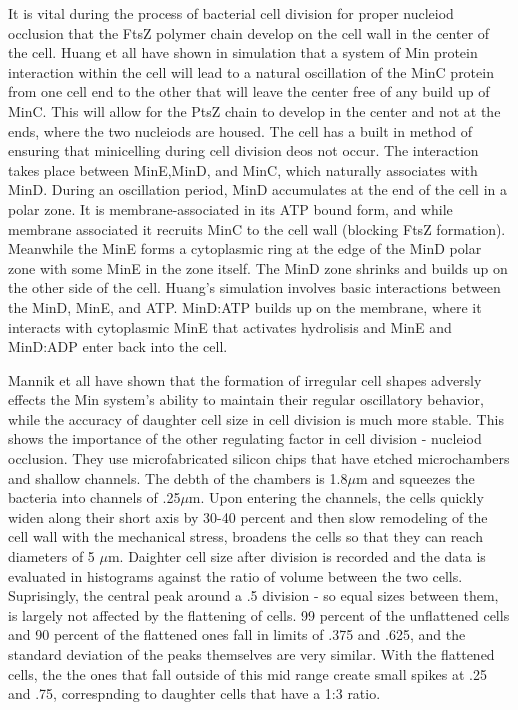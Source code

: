 \documentclass[pdftex,10pt,a4paper]{article}
\begin{document}



It is vital during the process of bacterial cell division for proper nucleiod occlusion that the FtsZ polymer chain develop on the cell wall in the center of the cell.  Huang et all have shown in simulation that a system of Min protein interaction within the cell will lead to a natural oscillation of the MinC protein from one cell end to the other that will leave the center free of any build up of MinC.  This will allow for the PtsZ chain to develop in the center and not at the ends, where the two nucleiods are housed.  The cell has a built in method of ensuring that minicelling during cell division deos not occur.  The interaction takes place between MinE,MinD, and MinC, which naturally associates with MinD.  During an oscillation period, MinD accumulates at the end of the cell in a polar zone.  It is membrane-associated in its ATP bound form, and while membrane associated it recruits MinC to the cell wall (blocking FtsZ formation).  Meanwhile the MinE forms a cytoplasmic ring at the edge of the MinD polar zone with some MinE in the zone itself.  The MinD zone shrinks and builds up on the other side of the cell.  Huang's simulation involves basic interactions between the MinD, MinE, and ATP.  MinD:ATP builds up on the membrane, where it interacts with cytoplasmic MinE that activates hydrolisis and MinE and MinD:ADP enter back into the cell.

Mannik et all have shown that the formation of irregular cell shapes adversly effects the Min system's ability to maintain their regular oscillatory behavior, while the accuracy of daughter cell size in cell division is much more stable.  This shows the importance of the other regulating factor in cell division - nucleiod occlusion.  They use microfabricated silicon chips that have etched microchambers and shallow channels.  The debth of the chambers is 1.8$\mu$m and squeezes the bacteria into channels of .25$\mu$m.  Upon entering the channels, the cells quickly widen along their short axis by 30-40 percent and then slow remodeling of the cell wall with the mechanical stress, broadens the cells so that they can reach diameters of 5 $\mu$m.  Daighter cell size after division is recorded and the data is evaluated in histograms against the ratio of volume between the two cells.  Suprisingly, the central peak around a .5 division - so equal sizes between them, is largely not affected by the flattening of cells.  99 percent of the unflattened cells and 90 percent of the flattened ones fall in limits of .375 and .625, and the standard deviation of the peaks themselves are very similar.  With the flattened cells, the the ones that fall outside of this mid range create small spikes at .25 and .75, correspnding to daughter cells that have a 1:3 ratio.
\end{document}
